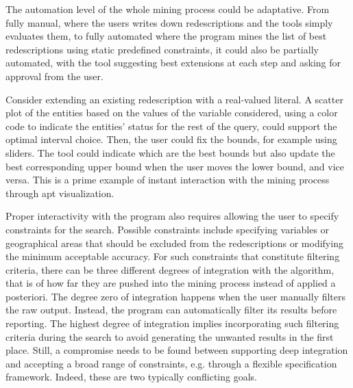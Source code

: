 The automation level of the whole mining process could be adaptative.
From fully manual, where the users writes down redescriptions and the
tools simply evaluates them, to fully automated where the program
mines the list of best redescriptions using static predefined
constraints, it could also be partially automated, with the tool
suggesting best extensions at each step and asking for approval from
the user.

Consider extending an existing redescription with a real-valued
literal.  A scatter plot of the entities based on the values of the
variable considered, using a color code to indicate the entities'
status for the rest of the query, could support the optimal
interval choice. Then, the user could fix the bounds, for example using
sliders.  The tool could indicate which are the best bounds but also
update the best corresponding upper bound when the user moves the lower bound,
 and vice versa. This is a prime example
of instant interaction with the mining process through apt visualization.

Proper interactivity with the program also requires allowing the user
to specify constraints for the search. Possible constraints include
specifying variables or geographical areas that should be excluded
from the redescriptions or modifying the minimum acceptable accuracy.
For such constraints that constitute filtering criteria, there can be
three different degrees of integration with the algorithm, that is of
how far they are pushed into the mining process instead of applied a
posteriori.  The degree zero of integration happens when the user
manually filters the raw output. Instead, the program can
automatically filter its results before reporting. The highest degree
of integration implies incorporating such filtering criteria during
the search to avoid generating the unwanted results in the first
place.  Still, a compromise needs to be found between supporting
deep integration and accepting a broad range of constraints,
e.g. through a flexible specification framework. Indeed, these are two
 typically conflicting goals.


